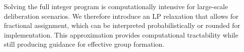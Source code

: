 Solving the full integer program is computationally intensive for large-scale deliberation scenarios.
We therefore introduce an LP relaxation that allows for fractional assignment,
which can be interpreted probabilistically or rounded for implementation.
This approximation provides computational tractability while still producing guidance for effective group formation.